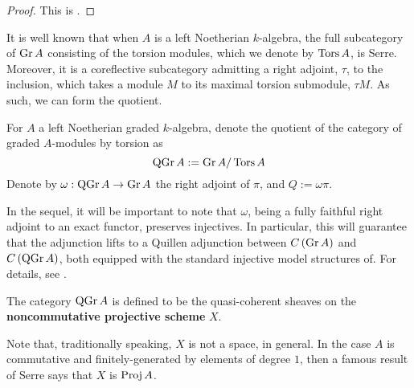 \begin{proof}
  This is \cite[Cor. 1, III.3]{DCA62}.
\end{proof}

It is well known that when \(A\) is a left Noetherian \(k\)-algebra, the full subcategory of \(\operatorname{Gr}A\) consisting of the torsion modules, which we denote by \(\operatorname{Tors}A\), is Serre.
Moreover, it is a coreflective subcategory admitting a right adjoint, \(\tau\), to the inclusion, which takes a module \(M\) to its maximal torsion submodule, \(\tau{M}\).
As such, we can form the quotient.
\begin{definition}
  For \(A\) a left Noetherian graded \(k\)-algebra, denote the quotient of the category of graded \(A\)-modules by torsion as
  \begin{displaymath}
    \operatorname{QGr}A := \operatorname{Gr}A / \operatorname{Tors}A
  \end{displaymath}
  Denote by \(\omega : \operatorname{QGr}A \to \operatorname{Gr}A\) the right adjoint of \(\pi\), and \(Q := \omega\pi\).
\end{definition}

\begin{remark}
  In the sequel, it will be important to note that \(\omega\), being a fully faithful right adjoint to an exact functor, preserves injectives.
  In particular, this will guarantee that the adjunction lifts to a Quillen adjunction between \(C\left(\operatorname{Gr}A\right)\) and \(C\left(\operatorname{QGr}A\right)\), both equipped with the standard injective model structures of.  For details, see \cite{Hovey01}.
\end{remark}

The category \(\operatorname{QGr}A\) is defined to be the quasi-coherent sheaves on the \textbf{noncommutative projective scheme} \(X\). 

\begin{remark}
  Note that, traditionally speaking, \(X\) is not a space, in general. In the case \(A\) is commutative and finitely-generated by elements of degree \(1\), then a famous result of Serre says that \(X\) is \(\operatorname{Proj} A\).
\end{remark}

